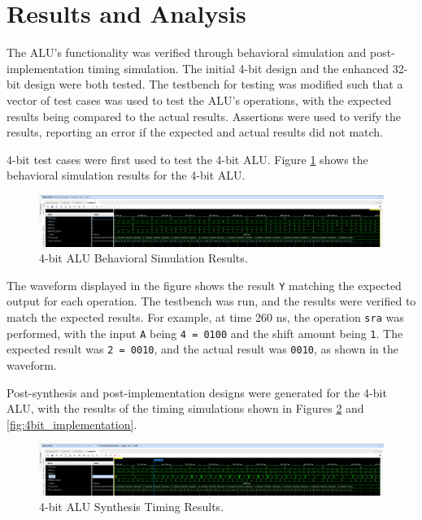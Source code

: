 \documentclass[CMPE]{../KGCOEReport}
\begin{document}
\section*{Results and Analysis}

The ALU's functionality was verified through behavioral simulation and post-implementation timing simulation. The initial 4-bit design and the enhanced 32-bit design were both tested. The testbench for testing was modified such that a vector of test cases was used to test the ALU's operations, with the expected results being compared to the actual results. Assertions were used to verify the results, reporting an error if the expected and actual results did not match.

4-bit test cases were first used to test the 4-bit ALU. Figure \ref{fig:4bit_behavior} shows the behavioral simulation results for the 4-bit ALU.

\begin{figure}[H]
    \centering
    \includegraphics[width=1\textwidth]{behavior.png}
    \caption{4-bit ALU Behavioral Simulation Results.}
    \label{fig:4bit_behavior}
\end{figure}

The waveform displayed in the figure shows the result \verb|Y| matching the expected output for each operation. The testbench was run, and the results were verified to match the expected results. For example, at time 260 ns, the operation \verb|sra| was performed, with the input \verb|A| being \verb|4 = 0100| and the shift amount being \verb|1|. The expected result was \verb|2 = 0010|, and the actual result was \verb|0010|, as shown in the waveform.

Post-synthesis and post-implementation designs were generated for the 4-bit ALU, with the results of the timing simulations shown in Figures \ref{fig:4bit_synthesis} and \ref{fig:4bit_implementation}.

\begin{figure}[H]
    \centering
    \includegraphics[width=1\textwidth]{synth.png}
    \caption{4-bit ALU Synthesis Timing Results.}
    \label{fig:4bit_synthesis}
\end{figure}
\end{document}
